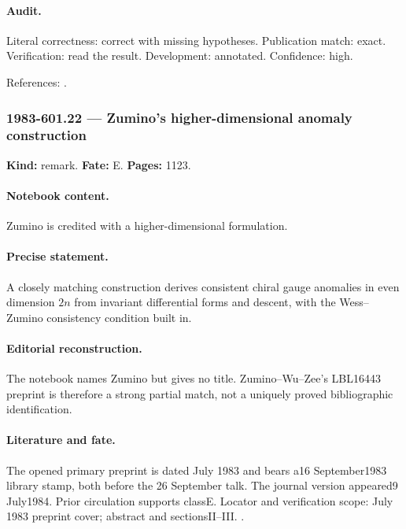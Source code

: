 \paragraph{Audit.} Literal correctness: correct with missing hypotheses. Publication match: exact. Verification: read the result. Development: annotated. Confidence: high.

\noindent References: \citep{witten1983current,novikov1982hamiltonian}.\par

\subsubsection{1983-601.22 --- Zumino's higher-dimensional anomaly construction}

\label{item:1983-601.22}

\noindent\textbf{Kind:} remark. \textbf{Fate:} E. \textbf{Pages:} 1123.\par

\paragraph{Notebook content.} Zumino is credited with a higher-dimensional formulation.

\paragraph{Precise statement.} A closely matching construction derives consistent chiral gauge anomalies in even dimension \(2n\) from invariant differential forms and descent, with the Wess--Zumino consistency condition built in.

\paragraph{Editorial reconstruction.} The notebook names Zumino but gives no title. Zumino--Wu--Zee's LBL16443 preprint is therefore a strong partial match, not a uniquely proved bibliographic identification.

\paragraph{Literature and fate.} The opened primary preprint is dated July 1983 and bears a16 September1983 library stamp, both before the 26 September talk. The journal version appeared9 July1984. Prior circulation supports classE. Locator and verification scope: July 1983 preprint cover; abstract and sectionsII--III. \cite{zuminowuzee1984anomalies}.

